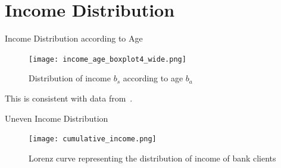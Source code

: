 \documentclass{beamer}
\begin{document}
\section{Income Distribution}

\begin{frame}{Income Distribution according to Age}

\begin{figure}
\begin{center}
\texttt{[image: income\_age\_boxplot4\_wide.png]}
\caption{Distribution of income $b_s$ according to age $b_a$}
\label{income_age_boxplot}
\end{center}
\end{figure}
This is consistent with data from~\cite{gallup2013}.

\end{frame}




\begin{frame}{Uneven Income Distribution}

\begin{figure}
\begin{center}
\texttt{[image: cumulative\_income.png]}
\caption{Lorenz curve representing the distribution of income of bank clients}
\label{fig:income_distribution}
\end{center}
\end{figure}

\end{frame}
\end{document}
